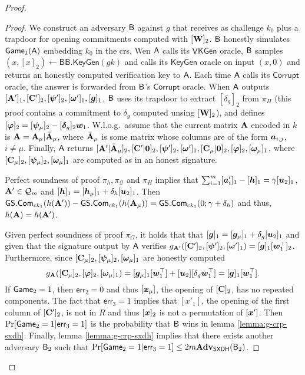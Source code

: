 \begin{proof}
\begin{proof}
We construct an adversary $\mathsf{B}$ against $g$ that receives as challenge $k_0$ plus a trapdoor for opening commitments computed with $[\mathbf{{W}}]_2$. $\mathsf{B}$ honestly simulates $\mathsf{Game}_1(\mathsf{A})$ embedding $k_0$ in the crs. Wen $\mathsf{A}$ calls its $\mathsf{VKGen}$ oracle, $\mathsf{B}$ samples $(x,[x]_2)\gets\mathsf{BB}.\mathsf{KeyGen}(gk)$ and calls its $\mathsf{KeyGen}$ oracle on input $(x,0)$ and returns an honestly computed verification key to $\mathsf{A}$. Each time $\mathsf{A}$ calls its $\mathsf{Corrupt}$ oracle, the answer is forwarded from $\mathsf{B}$'s  $\mathsf{Corrupt}$ oracle.
When $\mathsf{A}$ outputs $[\mathbf{{A}}']_1,[\mathbf{{C}}']_2,[{\boldsymbol{\psi}}']_2,[{\boldsymbol{\omega}}']_1,[{\boldsymbol{g}}]_1$, $\mathsf{B}$ uses its trapdoor to extract $[\delta_g]_2$ from $\pi_H$ (this proof contains a commitment to $\delta_g$ computed unsing $[\mathbf{{W}}]_2$), and defines $[{\boldsymbol{\varphi}}]_2 = [{\boldsymbol{\psi}}_\mu]_2 - [{\boldsymbol{\delta}}_g]_2{\boldsymbol{w}}_1$.
W.l.o.g.~\allowbreak assume that the current matrix $\mathbf{{A}}$ encoded in $k$ is $\mathbf{{A}}=\mathbf{{A}}_\mu|\bar{\mathbf{{A}}}_\mu$, where $\bar{\mathbf{{A}}}_\mu$ is some matrix whose columns are of the form ${\boldsymbol{a}}_{i,j}$, $i\neq \mu$. Finally, $\mathsf{A}$ returns
$[\mathbf{{A}}'|\bar{\mathbf{{A}}}_\mu]_2,[\mathbf{{C}}'|\mathbf{{0}}]_2,[{\boldsymbol{\psi}}']_2,[{\boldsymbol{\omega}}']_1,[\mathbf{{C}}_\mu|\mathbf{{0}}]_2,[{\boldsymbol{\varphi}}]_2,[{\boldsymbol{\omega}}_\mu]_1$, where $[\mathbf{{C}}_\mu]_2,[{\boldsymbol{\psi}}_\mu]_2,[{\boldsymbol{\omega}}_\mu]_1$ are computed as in an honest signature.

Perfect soundness of proof $\pi_h,\pi_{\mathcal{Q}}$ and $\pi_H$ implies that
$\sum_{i=1}^m[{\boldsymbol{a}}'_i]_1-[{\boldsymbol{h}}]_1=\gamma[{\boldsymbol{u}}_2]_1$, $\mathbf{{A}}'\in \mathcal{Q}_m$ and $[{\boldsymbol{h}}]_1 = [{\boldsymbol{h}}_\mu]_1 +\delta_h[{\boldsymbol{u}}_2]_1$. Then ${\mathsf{GS}}.\mathsf{Com}_{ck_1}(h(\mathbf{{A}}'))-{\mathsf{GS}}.\mathsf{Com}_{ck_1}(\allowbreak h(\mathbf{{A}}_\mu)) = {\mathsf{GS}}.\mathsf{Com}_{ck_1}(0;\gamma+\delta_h)$ and thus, $h(\mathbf{{A}})=h(\mathbf{{A}}')$.


Given perfect soundness of proof $\pi_G$, it holds that that $[{\boldsymbol{g}}]_1 = [{\boldsymbol{g}}_\mu]_1 +\delta_g[{\boldsymbol{u}}_2]_1$ and given that the signature output by $\mathsf{A}$ verifies $g_{\mathbf{{A}}'}([\mathbf{{C}}']_2,[{\boldsymbol{\psi}}']_2,[{\boldsymbol{\omega}}']_1) = [{\boldsymbol{g}}]_1[{\boldsymbol{w}}_1^\top]_2$. Furthermore, since $[\mathbf{{C}}_\mu]_2,[{\boldsymbol{\psi}}_\mu]_2,[{\boldsymbol{\omega}}_\mu]_1$ are honestly computed
$$
g_{\mathbf{{A}}}([\mathbf{{C}}_\mu]_2,[{\boldsymbol{\varphi}}]_2,[{\boldsymbol{\omega}}_\mu]_1) = [{\boldsymbol{g}}_\mu]_1[{\boldsymbol{w}}_1^\top] + [{\boldsymbol{u}}_2][\delta_g{\boldsymbol{w}}_1^\top] = [{\boldsymbol{g}}]_1[{\boldsymbol{w}}_1^\top].
$$
If $\mathsf{Game}_2=1$, then $\mathsf{err}_2=0$ and thus $[{\boldsymbol{x}}_\mu]$, the opening of $[\mathbf{{C}}]_2$, has no repeated components. The fact that $\mathsf{err}_3=1$ implies that $[x'_1]$, the opening of the first column of $[\mathbf{{C}}']_2$, is not in $R$ and thus $[{\boldsymbol{x}}]_2$ is not a permutation of $[{\boldsymbol{x}}']$.  Then $\Pr[\mathsf{Game}_2=1|\mathsf{err}_3=1]$ is the probability that $\mathsf{B}$ wins in lemma \ref{lemma:g-crp-sxdh}.
Finally, lemma  \ref{lemma:g-crp-sxdh} implies that there exists another adversary $\mathsf{B}_2$ such that $\Pr[\mathsf{Game}_2=1|\mathsf{err}_3=1]\leq 2m\mathbf{Adv}_\mathsf{SXDH}(\mathsf{B}_2)$.
\end{proof}


\end{proof}
